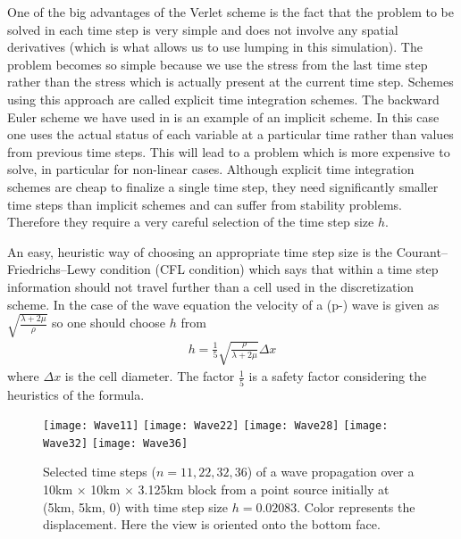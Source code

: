 One of the big advantages of the Verlet scheme is the fact that the problem to
be solved in each time step is very simple and does not involve any spatial
derivatives (which is what allows us to use lumping in this simulation).
The problem becomes so simple because we use the stress from the last time
step rather than the stress which is actually present at the current time step.
Schemes using this approach are called explicit time integration schemes.
The backward Euler scheme we have used in  is an example
of an implicit scheme.
In this case one uses the actual status of each variable at a particular time
rather than values from previous time steps.
This will lead to a problem which is more expensive to solve, in particular
for non-linear cases.
Although explicit time integration schemes are cheap to finalize a single time
step, they need significantly smaller time steps than implicit schemes and can
suffer from stability problems.
Therefore they require a very careful selection of the time step size $h$.

An easy, heuristic way of choosing an appropriate time step size is the
Courant–Friedrichs–Lewy condition (CFL condition)
which says that within a time step information should not travel further than
a cell used in the discretization scheme.
In the case of the wave equation the velocity of a (p-) wave is given as
$\sqrt{\frac{\lambda+2\mu}{\rho}}$ so one should choose $h$ from
\begin{eqnarray}\label{WAVE dyn 66}
h= \frac{1}{5} \sqrt{\frac{\rho}{\lambda+2\mu}} \Delta x
\end{eqnarray}
where $\Delta x$ is the cell diameter.
The factor $\frac{1}{5}$ is a safety factor considering the heuristics of the formula. 

\begin{figure}[t]
\begin{center}
\texttt{[image: Wave11]}
\texttt{[image: Wave22]}
\texttt{[image: Wave28]}
\texttt{[image: Wave32]}
\texttt{[image: Wave36]}
\end{center}
\caption{Selected time steps ($n = 11, 22, 32, 36$) of a wave propagation over
a 10km $\times$ 10km $\times$ 3.125km block from a point source initially at
(5km, 5km, 0) with time step size $h=0.02083$. Color represents the
displacement. Here the view is oriented onto the bottom face.
\label{WAVE FIG 2}}
\end{figure}

